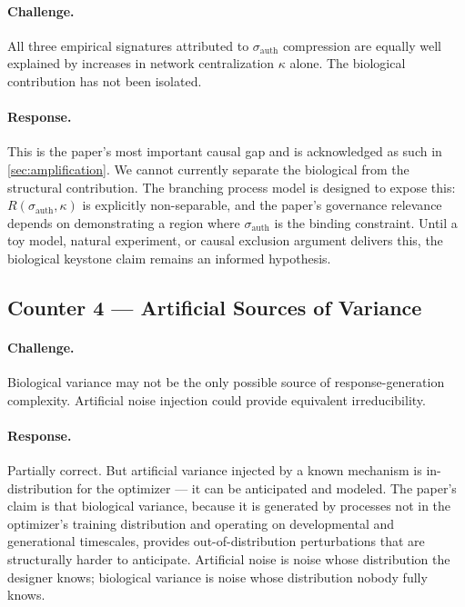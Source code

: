 \documentclass[11pt, a4paper]{article}
\theoremstyle{remark}
\begin{document}
\paragraph{Challenge.} All three empirical signatures attributed to $\sigma_{\text{auth}}$ compression are equally well explained by increases in network centralization $\kappa$ alone. The biological contribution has not been isolated.

\paragraph{Response.} This is the paper's most important causal gap and is acknowledged as such in \cref{sec:amplification}. We cannot currently separate the biological from the structural contribution. The branching process model is designed to expose this: $R(\sigma_{\text{auth}}, \kappa)$ is explicitly non-separable, and the paper's governance relevance depends on demonstrating a region where $\sigma_{\text{auth}}$ is the binding constraint. Until a toy model, natural experiment, or causal exclusion argument delivers this, the biological keystone claim remains an informed hypothesis.

\subsection{Counter 4 --- Artificial Sources of Variance}\label{sec:counter4}

\paragraph{Challenge.} Biological variance may not be the only possible source of response-generation complexity. Artificial noise injection could provide equivalent irreducibility.

\paragraph{Response.} Partially correct. But artificial variance injected by a known mechanism is in-distribution for the optimizer --- it can be anticipated and modeled. The paper's claim is that biological variance, because it is generated by processes not in the optimizer's training distribution and operating on developmental and generational timescales, provides out-of-distribution perturbations that are structurally harder to anticipate. Artificial noise is noise whose distribution the designer knows; biological variance is noise whose distribution nobody fully knows.
\end{document}
